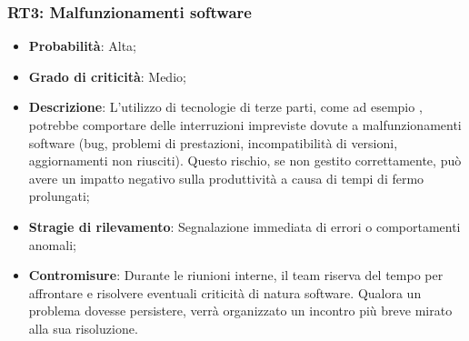 \subsubsection{RT3: Malfunzionamenti software}
\begin{itemize}
    \item \textbf{Probabilità}: Alta;
    \item \textbf{Grado di criticità}: Medio;
    \item \textbf{Descrizione}: L'utilizzo di tecnologie di terze parti, come ad esempio , potrebbe comportare delle interruzioni impreviste dovute a malfunzionamenti software (bug, problemi di prestazioni, incompatibilità di versioni, aggiornamenti non riusciti). Questo rischio, se non gestito correttamente, può avere un impatto negativo sulla produttività a causa di tempi di fermo prolungati;
    \item \textbf{Stragie di rilevamento}: Segnalazione immediata di errori o comportamenti anomali;
    \item \textbf{Contromisure}: Durante le riunioni interne, il team riserva del tempo per affrontare e risolvere eventuali criticità di natura software. Qualora un problema dovesse persistere, verrà organizzato un incontro più breve mirato alla sua risoluzione.
\end{itemize}
